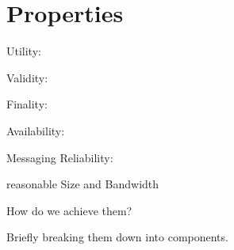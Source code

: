 \section{Properties}

 Utility:

 Validity:

 Finality:

 Availability:

 Messaging Reliability:

 reasonable Size and Bandwidth

 How do we achieve them?

 Briefly breaking them down into components.
